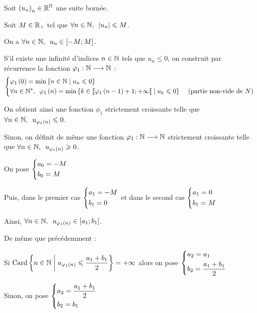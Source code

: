 \begin{dem}
Soit \(\left(u_n\right)_n\in\mathbb{R}^{\mathbb{N}}\) une suite bornée.

Soit \(M\in\mathbb{R}_+\) tel que \(\quantifs{\forall n\in\N}\abs{u_n}\leq M\).

On a \(\quantifs{\forall n\in\N}u_n\in\intervii{-M}{M}\).

S'il existe une infinité d'indices \(n\in\mathbb{N}\) tels que \(u_n\leq0\), on construit par récurrence la fonction \(\varphi_1:\mathbb{N}\longrightarrow\mathbb{N}\) : \[\begin{dcases}\phi_1\paren{0}=\min\accol{n\in\N\tq u_n\leq0} \\ \quantifs{\forall n\in\Ns}\phi_1\paren{n}=\min\accol{k\in\interventierie{\phi_1\paren{n-1}+1}{\pinf}\tq u_k\leq0}&\text{ (partie non-vide de \(N\))}\end{dcases}\]

On obtient ainsi une fonction \(\phi_1\) strictement croissante telle que \(\quantifs{\forall n\in\N}u_{\phi_1\paren{n}}\leq0\).

Sinon, on définit de même une fonction \(\varphi_1:\mathbb{N}\longrightarrow\mathbb{N}\) strictement croissante telle que \(\quantifs{\forall n\in\N}u_{\phi_1\paren{n}}\geq0\).

On pose \(\begin{dcases}a_0=-M \\ b_0=M\end{dcases}\)

Puis, dans le premier cas \(\begin{dcases}a_1=-M \\ b_1=0\end{dcases}\) et dans le second cas \(\begin{dcases}a_1=0 \\ b_1=M\end{dcases}\)

Ainsi, \(\quantifs{\forall n\in\N}u_{\phi_1\paren{n}}\in\intervii{a_1}{b_1}\).

De même que précédemment :

Si \(\operatorname{Card}\left\lbrace n\in\mathbb{N}\;\middle|\; u_{\varphi_1\left(n\right)}\leqslant\dfrac{a_1+b_1}{2}\right\rbrace=+\infty\) alors on pose \(\begin{dcases}a_2=a_1 \\ b_2=\dfrac{a_1+b_1}{2}\end{dcases}\)

Sinon, on pose \(\begin{dcases}a_2=\dfrac{a_1+b_1}{2} \\ b_2=b_1\end{dcases}\)


\end{dem}
